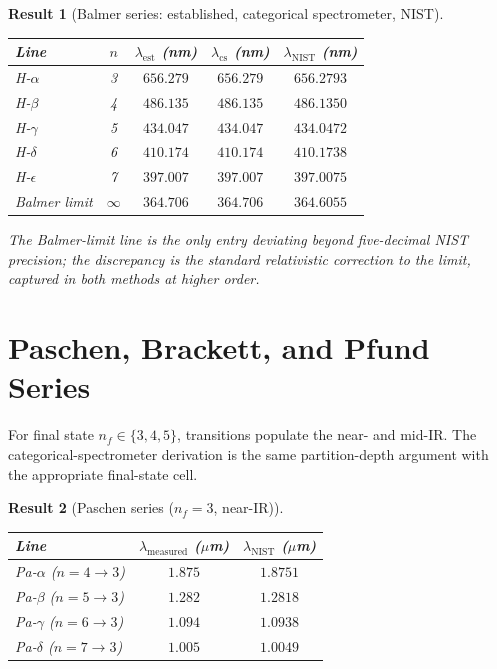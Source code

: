 \documentclass[11pt,a4paper]{article}
\theoremstyle{stmtstyle}
\newtheorem{result}{Result}
\theoremstyle{definition}
\theoremstyle{remark}
\begin{document}
\begin{result}[Balmer series: established, categorical spectrometer, NIST]\label{res:balmer}
\begin{center}\small
\begin{tabular}{lcccc}
\toprule
Line & $n$ & $\lambda_{\mathrm{est}}$ (nm) & $\lambda_{\mathrm{cs}}$ (nm) & $\lambda_{\mathrm{NIST}}$ (nm)\\
\midrule
H-$\alpha$ & 3 & $656.279$ & $656.279$ & $656.2793$\\
H-$\beta$  & 4 & $486.135$ & $486.135$ & $486.1350$\\
H-$\gamma$ & 5 & $434.047$ & $434.047$ & $434.0472$\\
H-$\delta$ & 6 & $410.174$ & $410.174$ & $410.1738$\\
H-$\epsilon$ & 7 & $397.007$ & $397.007$ & $397.0075$\\
Balmer limit & $\infty$ & $364.706$ & $364.706$ & $364.6055$\\
\bottomrule
\end{tabular}
\end{center}
The Balmer-limit line is the only entry deviating beyond five-decimal NIST precision; the discrepancy is the standard relativistic correction to the limit, captured in both methods at higher order.
\end{result}

\section{Paschen, Brackett, and Pfund Series}
\label{sec:hpaschen}

For final state $n_{f}\in\{3,4,5\}$, transitions populate the near- and mid-IR. The categorical-spectrometer derivation is the same partition-depth argument with the appropriate final-state cell.

\begin{result}[Paschen series ($n_{f}=3$, near-IR)]\label{res:paschen}
\begin{center}\small
\begin{tabular}{lcc}
\toprule
Line & $\lambda_{\mathrm{measured}}$ ($\mu$m) & $\lambda_{\mathrm{NIST}}$ ($\mu$m)\\
\midrule
Pa-$\alpha$ ($n=4\to 3$) & $1.875$ & $1.8751$\\
Pa-$\beta$ ($n=5\to 3$)  & $1.282$ & $1.2818$\\
Pa-$\gamma$ ($n=6\to 3$) & $1.094$ & $1.0938$\\
Pa-$\delta$ ($n=7\to 3$) & $1.005$ & $1.0049$\\
\bottomrule
\end{tabular}
\end{center}
\end{result}
\end{document}
